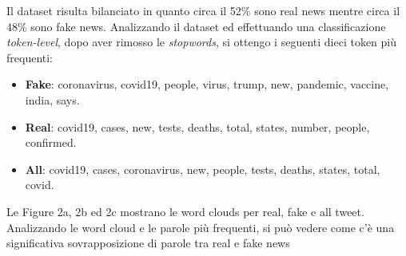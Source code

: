 \documentclass{article}
\begin{document}
\noindent
Il dataset risulta bilanciato in quanto circa il 52\% sono real news mentre circa il 48\% sono fake news.
Analizzando il dataset ed effettuando una classificazione \textit{token-level}, dopo aver rimosso le \textit{stopwords}, si ottengo i seguenti dieci token più frequenti:
\begin{itemize}[noitemsep]
  \item \textbf{Fake}: coronavirus, covid19, people, virus, trump, new, pandemic, vaccine, india, says.
  \item \textbf{Real}: covid19, cases, new, tests, deaths, total, states, number, people, confirmed.
  \item \textbf{All}: covid19, cases, coronavirus, new, people, tests, deaths, states, total, covid.
\end{itemize}

\noindent
Le Figure 2a, 2b ed 2c mostrano le word clouds per real, fake e all tweet. Analizzando le word cloud e le parole più frequenti, si può vedere come c'è una significativa sovrapposizione di parole tra real e fake news
\end{document}
